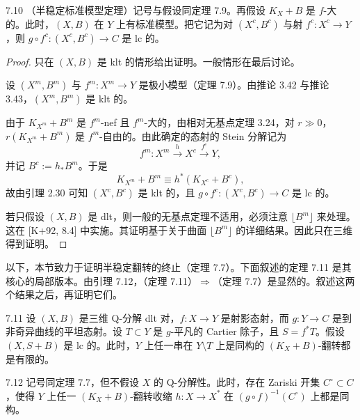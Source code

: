 \begin{theoremp}{7.10}
（半稳定标准模型定理）记号与假设同定理 7.9。再假设 $K_X+B$ 是 $f$-大的。此时，$(X,B)$ 在 $Y$ 上有标准模型。把它记为对 $(X^c,B^c)$ 与射 $f^c\colon X^c\to Y$，则 $g\circ f^c\colon(X^c,B^c)\to C$ 是 lc 的。
\end{theoremp}

\begin{proof}
只在 $(X,B)$ 是 klt 的情形给出证明。一般情形在最后讨论。

设 $(X^m,B^m)$ 与 $f^m\colon X^m\to Y$ 是极小模型（定理 7.9）。由推论 3.42 与推论 3.43，$(X^m,B^m)$ 是 klt 的。

由于 $K_{X^m}+B^m$ 是 $f^m$-nef 且 $f^m$-大的，由相对无基点定理 3.24，对 $r\gg0$，$r(K_{X^m}+B^m)$ 是 $f^m$-自由的。由此确定的态射的 Stein 分解记为
\[
f^m\colon X^m\xrightarrow{\ h\ }X^c\xrightarrow{\ f^c\ }Y,
\]
并记 $B^c:=h_*B^m$。于是
\[
K_{X^m}+B^m\equiv h^*(K_{X^c}+B^c),
\]
故由引理 2.30 可知 $(X^c,B^c)$ 是 klt 的，且 $g\circ f^c\colon(X^c,B^c)\to C$ 是 lc 的。

若只假设 $(X,B)$ 是 dlt，则一般的无基点定理不适用，必须注意 $\lfloor B^m\rfloor$ 来处理。这在 [K+92, 8.4] 中实施。其证明基于关于曲面 $\lfloor B^m\rfloor$ 的详细结果。因此只在三维得到证明。
\end{proof}

以下，本节致力于证明半稳定翻转的终止（定理 7.7）。下面叙述的定理 7.11 是其核心的局部版本。由引理 7.12，（定理 7.11）$\Rightarrow$（定理 7.7）是显然的。叙述这两个结果之后，再证明它们。

\begin{theorem*}{7.11}
设 $(X,B)$ 是三维 Q-分解 dlt 对，$f\colon X\to Y$ 是射影态射，而 $g\colon Y\to C$ 是到非奇异曲线的平坦态射。设 $T\subset Y$ 是 $g$-平凡的 Cartier 除子，且 $S=f^*T$。假设 $(X,S+B)$ 是 lc 的。此时，$Y$ 上任一串在 $Y\setminus T$ 上是同构的 $(K_X+B)$-翻转都是有限的。
\end{theorem*}

\begin{lemmap}{7.12}
记号同定理 7.7，但不假设 $X$ 的 Q-分解性。此时，存在 Zariski 开集 $C^\circ\subset C$，使得 $Y$ 上任一 $(K_X+B)$-翻转收缩 $h\colon X\to X^*$ 在 $(g\circ f)^{-1}(C^\circ)$ 上都是同构。
\end{lemmap}

